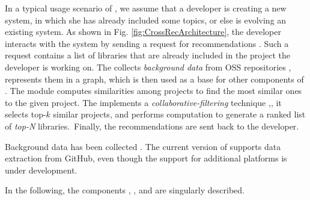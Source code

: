 
In a typical usage scenario of \CR, we assume that a developer is creating a new system, in which she has already included some topics, or else is evolving an existing system.
As shown in Fig. \ref{fig:CrossRecArchitecture}, the developer interacts with the system by sending a request for recommendations . 
Such a request contains a list of 
libraries that are already included in the project the developer is working on. 
The   collects \emph{background data} from OSS 
repositories , represents them in a graph, which is then used as a 
base for other components of \CR. The   
module  computes similarities among projects to find the most 
similar ones to 
the given project. The   
implements a \emph{collaborative-filtering} technique 
\cite{Aggarwal2016},\cite{Zhao:2010:UCR:1748610.1749278}, it selects top-$k$ similar 
projects, and performs computation to generate a ranked list of \emph{top-N} 
libraries.~Finally, the recommendations  are sent back to the developer. 

Background data has been collected \GH \cite{github}. The 
current version of \CR \cite{appendix} supports data extraction from 
GitHub, even though the support for additional platforms is under development.









In the following, the components , , and  are singularly described. %

